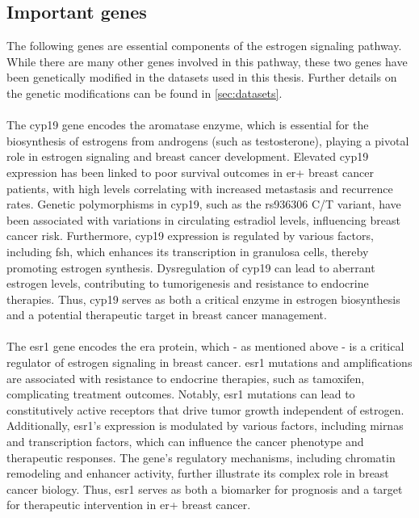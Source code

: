 \subsection{Important genes}
\label{sec:important_genes}

The following genes are essential components of the estrogen signaling pathway.
While there are many other genes involved in this pathway, these two genes have
been genetically modified in the datasets used in this thesis.
Further details on the genetic modifications can be found in
\cref{sec:datasets}.

\paragraph{}
The \gls{cyp19} gene encodes the aromatase enzyme, which is essential for the
biosynthesis of estrogens from androgens (such as testosterone), playing a
pivotal role in estrogen signaling and breast cancer development.
Elevated \gls{cyp19} expression has been linked to poor survival outcomes in
\gls{er+} breast cancer patients, with high levels correlating with increased
metastasis and recurrence
rates\supercite{barros-oliveira_cyp19a1_2020,friesenhengst_elevated_2018}.
Genetic polymorphisms in \gls{cyp19}, such as the rs936306 C/T variant, have
been associated with variations in circulating estradiol levels, influencing
breast cancer risk\supercite{ghosh_potential_2012}.
Furthermore, \gls{cyp19} expression is regulated by various factors, including
\gls{fsh}, which enhances its transcription in granulosa cells, thereby
promoting estrogen
synthesis\supercite{savolainen-peltonen_estrogen_2018,li_microrna-7a2_2022}.
Dysregulation of \gls{cyp19} can lead to aberrant estrogen levels, contributing
to tumorigenesis and resistance to endocrine
therapies\supercite{dabydeen_comparison_2015}.
Thus, \gls{cyp19} serves as both a critical enzyme in estrogen biosynthesis and
a potential therapeutic target in breast cancer management.

\paragraph{}
The \gls{esr1} gene encodes the \gls{era} protein, which - as mentioned above -
is a critical regulator of estrogen signaling in breast cancer.
\Gls{esr1} mutations and amplifications are associated with resistance to
endocrine
therapies, such as tamoxifen, complicating treatment
outcomes\supercite{aguilar_biological_2010,jeselsohn_emergence_2014}.
Notably, \gls{esr1} mutations can lead to constitutively active receptors that
drive tumor growth independent of estrogen\supercite{toy_activating_2017}.
Additionally, \gls{esr1}'s expression is modulated by various factors,
including \glspl{mirna} and transcription factors, which can influence the
cancer phenotype and therapeutic responses\supercite{mansoori_mir-142-3p_2019}.
The gene's regulatory mechanisms, including chromatin remodeling and enhancer
activity, further illustrate its complex role in breast cancer
biology\supercite{powers_proteasome_2013,tomita_cluster_2015}.
Thus, \gls{esr1} serves as both a biomarker for prognosis and a target for
therapeutic intervention in \gls{er+} breast cancer.
